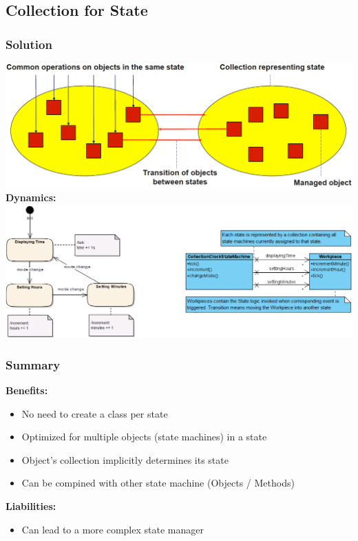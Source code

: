 \subsection{Collection for State}
\subsubsection{Solution}
\includegraphics[width=\linewidth]{./img/collection_for_state.png}
\textbf{Dynamics:}\\ 
\includegraphics[width=\linewidth]{./img/collection_for_state_dynamic.png}
\subsubsection{Summary}
\textbf{Benefits:}
\begin{itemize}
    \item No need to create a class per state
    \item Optimized for multiple objects (state machines) in a state
    \item Object's collection implicitly determines its state
    \item Can be compined with other state machine (Objects / Methods)
\end{itemize}
\textbf{Liabilities:}
\begin{itemize}
    \item Can lead to a more complex state manager
\end{itemize}

